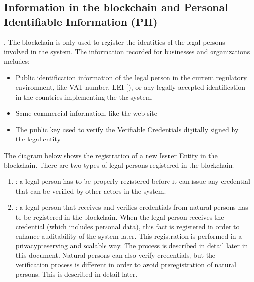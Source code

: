 \documentclass[letterpaper,10pt,english]{sphinxmanual}
\begin{document}
\subsection{Information in the blockchain and Personal Identifiable Information (PII)}
\label{\detokenize{privacycred:information-in-the-blockchain-and-personal-identifiable-information-pii}}
\sphinxAtStartPar
{}. The blockchain is only used  to register the identities of the legal persons involved in the system. The information recorded for businesses and organizations includes:
\begin{itemize}
\item {} 
\sphinxAtStartPar
Public identification information of the legal person in the current regulatory environment, like VAT number, LEI (), or any legally accepted identification in the countries implementing the the system.

\item {} 
\sphinxAtStartPar
Some commercial information, like the web site

\item {} 
\sphinxAtStartPar
The public key used to verify the Verifiable Credentials digitally signed by the legal entity

\end{itemize}

\sphinxAtStartPar
The diagram below shows the registration of a new Issuer Entity in the blockchain. There are two types of legal persons registered in the blockchain:
\begin{enumerate}
%
\item {} 
\sphinxAtStartPar
{}: a legal person has to be properly registered before it can issue any credential that can be verified by other actors in the system.

\item {} 
\sphinxAtStartPar
{}: a legal person that receives and verifies credentials from natural persons has to be registered in the blockchain. When the legal person receives the credential (which includes personal data), this fact is registered in order to enhance auditability of the system later. This registration is performed in a privacy\sphinxhyphen{}preserving and scalable way. The process is described in detail later in this document. Natural persons can also verify credentials, but the verification process is different in order to avoid pre\sphinxhyphen{}registration of natural persons. This is described in detail later.

\end{enumerate}
\end{document}
